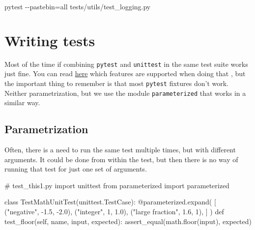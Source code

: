 \documentclass[
]{report}
\newenvironment{Shaded}{\begin{snugshade}}{\end{snugshade}}
\newcommand{\AttributeTok}[1]{\textcolor[rgb]{0.40,0.45,0.13}{#1}}
\newcommand{\BuiltInTok}[1]{\textcolor[rgb]{0.00,0.23,0.31}{#1}}
\newcommand{\CommentTok}[1]{\textcolor[rgb]{0.37,0.37,0.37}{#1}}
\newcommand{\DecValTok}[1]{\textcolor[rgb]{0.68,0.00,0.00}{#1}}
\newcommand{\ExtensionTok}[1]{\textcolor[rgb]{0.00,0.23,0.31}{#1}}
\newcommand{\FloatTok}[1]{\textcolor[rgb]{0.68,0.00,0.00}{#1}}
\newcommand{\ImportTok}[1]{\textcolor[rgb]{0.00,0.46,0.62}{#1}}
\newcommand{\KeywordTok}[1]{\textcolor[rgb]{0.00,0.23,0.31}{#1}}
\newcommand{\NormalTok}[1]{\textcolor[rgb]{0.00,0.23,0.31}{#1}}
\newcommand{\OperatorTok}[1]{\textcolor[rgb]{0.37,0.37,0.37}{#1}}
\newcommand{\StringTok}[1]{\textcolor[rgb]{0.13,0.47,0.30}{#1}}
\newcommand{\VariableTok}[1]{\textcolor[rgb]{0.07,0.07,0.07}{#1}}
\begin{document}
\begin{Shaded}
\begin{Highlighting}[]
\ExtensionTok{pytest} \AttributeTok{{-}{-}pastebin}\OperatorTok{=}\NormalTok{all tests/utils/test\_logging.py}
\end{Highlighting}
\end{Shaded}

\section{Writing tests}\label{writing-tests}

Most of the time if combining \texttt{pytest} and \texttt{unittest} in
the same test suite works just fine. You can read
\href{https://docs.pytest.org/en/stable/unittest.html}{here} which
features are supported when doing that , but the important thing to
remember is that most \texttt{pytest} fixtures don't work. Neither
parametrization, but we use the module \texttt{parameterized} that works
in a similar way.

\subsection{Parametrization}\label{parametrization}

Often, there is a need to run the same test multiple times, but with
different arguments. It could be done from within the test, but then
there is no way of running that test for just one set of arguments.

\begin{Shaded}
\begin{Highlighting}[]
\CommentTok{\# test\_this1.py}
\ImportTok{import}\NormalTok{ unittest}
\ImportTok{from}\NormalTok{ parameterized }\ImportTok{import}\NormalTok{ parameterized}


\KeywordTok{class}\NormalTok{ TestMathUnitTest(unittest.TestCase):}
    \AttributeTok{@parameterized.expand}\NormalTok{(}
\NormalTok{        [}
\NormalTok{            (}\StringTok{"negative"}\NormalTok{, }\OperatorTok{{-}}\FloatTok{1.5}\NormalTok{, }\OperatorTok{{-}}\FloatTok{2.0}\NormalTok{),}
\NormalTok{            (}\StringTok{"integer"}\NormalTok{, }\DecValTok{1}\NormalTok{, }\FloatTok{1.0}\NormalTok{),}
\NormalTok{            (}\StringTok{"large fraction"}\NormalTok{, }\FloatTok{1.6}\NormalTok{, }\DecValTok{1}\NormalTok{),}
\NormalTok{        ]}
\NormalTok{    )}
    \KeywordTok{def}\NormalTok{ test\_floor(}\VariableTok{self}\NormalTok{, name, }\BuiltInTok{input}\NormalTok{, expected):}
\NormalTok{        assert\_equal(math.floor(}\BuiltInTok{input}\NormalTok{), expected)}
\end{Highlighting}
\end{Shaded}
\end{document}
